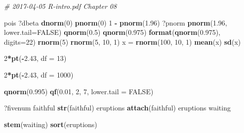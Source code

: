 \documentclass[11pt,]{krantz}
\makeatletter
\newenvironment{Shaded}{\begin{snugshade}}{\end{snugshade}}
\newcommand{\KeywordTok}[1]{\textcolor[rgb]{0.13,0.29,0.53}{\textbf{#1}}}
\newcommand{\DataTypeTok}[1]{\textcolor[rgb]{0.13,0.29,0.53}{#1}}
\newcommand{\DecValTok}[1]{\textcolor[rgb]{0.00,0.00,0.81}{#1}}
\newcommand{\FloatTok}[1]{\textcolor[rgb]{0.00,0.00,0.81}{#1}}
\newcommand{\StringTok}[1]{\textcolor[rgb]{0.31,0.60,0.02}{#1}}
\newcommand{\CommentTok}[1]{\textcolor[rgb]{0.56,0.35,0.01}{\textit{#1}}}
\newcommand{\OtherTok}[1]{\textcolor[rgb]{0.56,0.35,0.01}{#1}}
\newcommand{\OperatorTok}[1]{\textcolor[rgb]{0.81,0.36,0.00}{\textbf{#1}}}
\newcommand{\NormalTok}[1]{#1}
\newenvironment{kframe}{%
\medskip{}
\setlength{\fboxsep}{.8em}
 \def\at@end@of@kframe{}%
 \ifinner\ifhmode%
  \def\at@end@of@kframe{\end{minipage}}%
  \begin{minipage}{\columnwidth}%
 \fi\fi%
 \def\FrameCommand##1{\hskip\@totalleftmargin \hskip-\fboxsep
 \colorbox{shadecolor}{##1}\hskip-\fboxsep
     \hskip-\linewidth \hskip-\@totalleftmargin \hskip\columnwidth}%
 \MakeFramed {\advance\hsize-\width
   \@totalleftmargin\z@ \linewidth\hsize
   \@setminipage}}%
 {\par\unskip\endMakeFramed%
 \at@end@of@kframe}
\renewenvironment{Shaded}{\begin{kframe}}{\end{kframe}}
\theoremstyle{definition}
\theoremstyle{definition}
\theoremstyle{remark}
\makeatother
\begin{document}
\begin{Shaded}
\begin{Highlighting}[]
\CommentTok{# 2017-04-05 R-intro.pdf Chapter 08}

\NormalTok{pois}
\NormalTok{?dbeta}
\KeywordTok{dnorm}\NormalTok{(}\DecValTok{0}\NormalTok{)}
\KeywordTok{pnorm}\NormalTok{(}\DecValTok{0}\NormalTok{)}
\DecValTok{1} \OperatorTok{-}\StringTok{ }\KeywordTok{pnorm}\NormalTok{(}\FloatTok{1.96}\NormalTok{)}
\NormalTok{?pnorm}
\KeywordTok{pnorm}\NormalTok{(}\FloatTok{1.96}\NormalTok{, }\DataTypeTok{lower.tail=}\OtherTok{FALSE}\NormalTok{)}
\KeywordTok{qnorm}\NormalTok{(}\FloatTok{0.5}\NormalTok{)}
\KeywordTok{qnorm}\NormalTok{(}\FloatTok{0.975}\NormalTok{)}
\KeywordTok{format}\NormalTok{(}\KeywordTok{qnorm}\NormalTok{(}\FloatTok{0.975}\NormalTok{), }\DataTypeTok{digits=}\DecValTok{22}\NormalTok{)}
\KeywordTok{rnorm}\NormalTok{(}\DecValTok{5}\NormalTok{)}
\KeywordTok{rnorm}\NormalTok{(}\DecValTok{5}\NormalTok{, }\DecValTok{10}\NormalTok{, }\DecValTok{1}\NormalTok{)}
\NormalTok{x =}\StringTok{ }\KeywordTok{rnorm}\NormalTok{(}\DecValTok{100}\NormalTok{, }\DecValTok{10}\NormalTok{, }\DecValTok{1}\NormalTok{)}
\KeywordTok{mean}\NormalTok{(x)}
\KeywordTok{sd}\NormalTok{(x)}

\DecValTok{2}\OperatorTok{*}\KeywordTok{pt}\NormalTok{(}\OperatorTok{-}\FloatTok{2.43}\NormalTok{, }\DataTypeTok{df =} \DecValTok{13}\NormalTok{)}

\DecValTok{2}\OperatorTok{*}\KeywordTok{pt}\NormalTok{(}\OperatorTok{-}\FloatTok{2.43}\NormalTok{, }\DataTypeTok{df =} \DecValTok{1000}\NormalTok{)}

\KeywordTok{qnorm}\NormalTok{(}\FloatTok{0.995}\NormalTok{)}
\KeywordTok{qf}\NormalTok{(}\FloatTok{0.01}\NormalTok{, }\DecValTok{2}\NormalTok{, }\DecValTok{7}\NormalTok{, }\DataTypeTok{lower.tail =} \OtherTok{FALSE}\NormalTok{)}

\NormalTok{?fivenum}
\NormalTok{faithful}
\KeywordTok{str}\NormalTok{(faithful)}
\NormalTok{eruptions}
\KeywordTok{attach}\NormalTok{(faithful)}
\NormalTok{eruptions}
\NormalTok{waiting}

\KeywordTok{stem}\NormalTok{(waiting)}
\KeywordTok{sort}\NormalTok{(eruptions)}


\end{Highlighting}
\end{Shaded}
\end{document}
